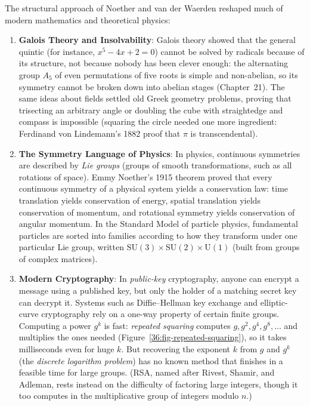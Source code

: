 The structural approach of Noether and van der Waerden reshaped much of modern mathematics and theoretical physics:
\begin{enumerate}
  \item \textbf{Galois Theory and Insolvability}: Galois theory showed that the general quintic (for instance, $x^5 - 4x + 2 = 0$) cannot be solved by radicals because of its structure, not because nobody has been clever enough: the alternating group $A_5$ of even permutations of five roots is simple and non-abelian, so its symmetry cannot be broken down into abelian stages (Chapter~21). The same ideas about fields settled old Greek geometry problems, proving that trisecting an arbitrary angle or doubling the cube with straightedge and compass is impossible (squaring the circle needed one more ingredient: Ferdinand von Lindemann's 1882 proof that $\pi$ is transcendental).
  \item \textbf{The Symmetry Language of Physics}: In physics, continuous symmetries are described by \emph{Lie groups} (groups of smooth transformations, such as all rotations of space). Emmy Noether's 1915 theorem proved that every continuous symmetry of a physical system yields a conservation law: time translation yields conservation of energy, spatial translation yields conservation of momentum, and rotational symmetry yields conservation of angular momentum. In the Standard Model of particle physics, fundamental particles are sorted into families according to how they transform under one particular Lie group, written $\mathrm{SU}(3) \times \mathrm{SU}(2) \times \mathrm{U}(1)$ (built from groups of complex matrices).
  \item \textbf{Modern Cryptography}: In \emph{public-key} cryptography, anyone can encrypt a message using a published key, but only the holder of a matching secret key can decrypt it. Systems such as Diffie--Hellman key exchange and elliptic-curve cryptography rely on a one-way property of certain finite groups. Computing a power $g^k$ is fast: \emph{repeated squaring} computes $g, g^2, g^4, g^8, \dots$ and multiplies the ones needed (Figure~\ref{36:fig-repeated-squaring}), so it takes milliseconds even for huge $k$. But recovering the exponent $k$ from $g$ and $g^k$ (the \emph{discrete logarithm problem}) has no known method that finishes in a feasible time for large groups. (RSA, named after Rivest, Shamir, and Adleman, rests instead on the difficulty of factoring large integers, though it too computes in the multiplicative group of integers modulo $n$.)
\end{enumerate}

